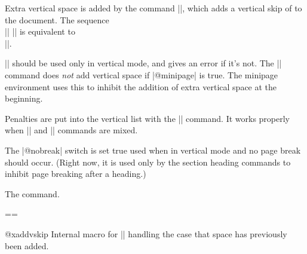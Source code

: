  Extra vertical space is added by the command
 |\addvspace|,
 which adds a vertical skip of  to the document.
 The sequence\\
         |\addvspace| |\addvspace|
 is equivalent to\\
         |\addvspace|.

 |\addvspace| should be used only in vertical mode, and gives an
 error if it's not.  The |\addvspace| command does \emph{not} add
 vertical space if |@minipage| is true. The minipage environment uses
 this to inhibit the addition of extra vertical space at the beginning.

 Penalties are put into the vertical list with the
 |\addpenalty|
 command.  It works properly when |\addpenalty| and |\addvspace|
 commands are mixed.

 The |@nobreak| switch is set true used when in vertical mode and no
 page break should occur.  (Right now, it is used only by the section
 heading commands to inhibit page breaking after a heading.)




\LinesNumbered
\begin{algorithm}
\caption{The  command.}
  ==

\end{algorithm}



 \begin{docCommand}{@xaddvskip}{ }
 Internal macro for |\vspace| handling the case that space has
 previously been added.
  \end{docCommand}
  
    \begin{teX}
\def\@xaddvskip{%
  \ifdim\lastskip<\@tempskipb
    \vskip-\lastskip
    \vskip\@tempskipb
  \else
    \ifdim\@tempskipb<\z@
      \ifdim\lastskip<\z@
      \else
        \advance\@tempskipb\lastskip
        \vskip-\lastskip
        \vskip \@tempskipb
      \fi
    \fi
  \fi}
    \end{teX}

